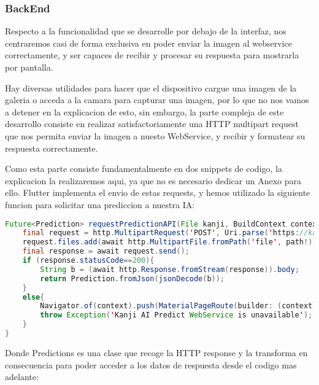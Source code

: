 \documentclass{article}
\begin{document}
\subsubsection{BackEnd}
Respecto a la funcionalidad que se desarrolle por debajo de la interfaz, nos centraremos casi de forma exclusiva en poder enviar la imagen al webservice correctamente, y ser capaces de recibir y procesar su respuesta para mostrarla por pantalla.

Hay diversas utilidades para hacer que el dispositivo cargue una imagen de la galeria o acceda a la camara para capturar una imagen, por lo que no nos vamos a detener en la explicacion de esto, sin embargo, la parte compleja de este desarrollo consiste en realizar satisfactoriamente una HTTP multipart request que nos permita enviar la imagen a nuesto WebService, y recibir y formatear su respuesta correctamente.

Como esta parte consiste fundamentalmente en dos snippets de codigo, la explicacion la realizaremos aqui, ya que no es necesario dedicar un Anexo para ello. Flutter implementa el envio de estas requests, y hemos utilizado la siguiente funcion para solicitar una prediccion a nuestra IA:

\noindent\begin{minipage}{\textwidth}
\begin{lstlisting}[language=java]
Future<Prediction> requestPredictionAPI(File kanji, BuildContext context) async{
    final request = http.MultipartRequest('POST', Uri.parse('https://kanji.otterleek.com/'));
    request.files.add(await http.MultipartFile.fromPath('file', path!));
    final response = await request.send();
    if (response.statusCode==200){
        String b = (await http.Response.fromStream(response)).body;
        return Prediction.fromJson(jsonDecode(b));
    }
    else{
        Navigator.of(context).push(MaterialPageRoute(builder: (context) => Unavailable())); 
        throw Exception('Kanji AI Predict WebService is unavailable');
    }
}
\end{lstlisting}
\end{minipage}
Donde Predictions es una clase que recoge la HTTP response y la transforma en consecuencia para poder acceder a los datos de respuesta desde el codigo mas adelante:
\end{document}
